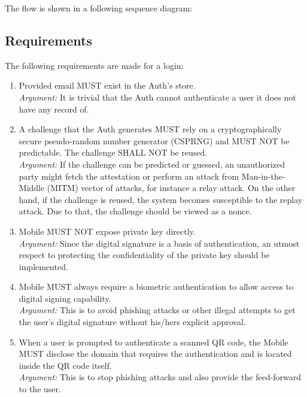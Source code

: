     The flow is shown in a following sequence diagram: 
        

    \subsection{Requirements}
    The following requirements are made for a login:
        \begin{enumerate}
            \item Provided email MUST exist in the Auth's store.\\
            \textit{Argument:} It is trivial that the Auth cannot authenticate a user it does not have any record
                               of.         

            \item A challenge that the Auth generates MUST rely on a cryptographically secure pseudo-random number 
                  generator (CSPRNG) and MUST NOT be predictable. The challenge SHALL NOT be reused.\\
            \textit{Argument:} If the challenge can be predicted or guessed, an unauthorized party might fetch the
                               attestation or perform an attack from Man-in-the-Middle (MITM) vector of attacks, for
                               instance a relay attack. On the other hand, if the challenge is reused, the system 
                               becomes susceptible to the replay attack. Due to that, the challenge should be 
                               viewed as a nonce.

            \item Mobile MUST NOT expose private key directly.\\
            \textit{Argument:} Since the digital signature is a basis of authentication, an utmost respect to 
                               protecting the confidentiality of the private key should be implemented.

            \item Mobile MUST always require a biometric authentication to allow access to digital signing 
                  capability.\\        
            \textit{Argument:} This is to avoid phishing attacks or other illegal attempts to get the user's 
                               digital signature without his/hers explicit approval.

            \item When a user is prompted to authenticate a scanned QR code, the Mobile MUST disclose the domain that 
                  requires the authentication and is located inside the QR code itself.\\
            \textit{Argument:} This is to stop phishing attacks and also provide the feed-forward to the user.


\end{enumerate}
